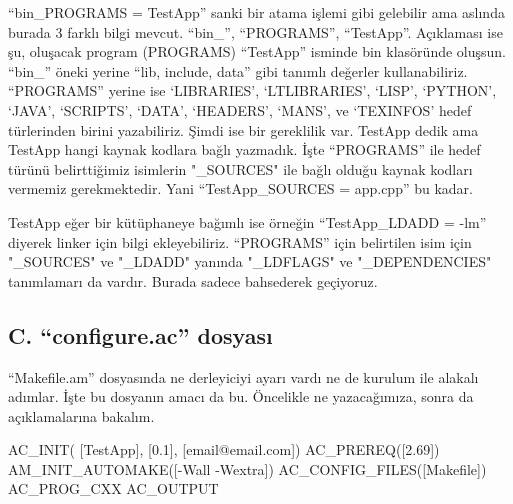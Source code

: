 \documentclass[
]{book}
\newenvironment{Shaded}{\begin{snugshade}}{\end{snugshade}}
\newcommand{\ExtensionTok}[1]{#1}
\newcommand{\NormalTok}[1]{#1}
\begin{document}
``bin\_PROGRAMS = TestApp'' sanki bir atama işlemi gibi gelebilir ama aslında burada 3 farklı bilgi mevcut. ``bin\_'', ``PROGRAMS'', ``TestApp''. Açıklaması ise şu, oluşacak program (PROGRAMS) ``TestApp'' isminde bin klasöründe oluşsun. ``bin\_'' öneki yerine ``lib, include, data'' gibi tanımlı değerler kullanabiliriz. ``PROGRAMS'' yerine ise `LIBRARIES', `LTLIBRARIES', `LISP', `PYTHON', `JAVA', `SCRIPTS', `DATA', `HEADERS', `MANS', ve `TEXINFOS' hedef türlerinden birini yazabiliriz. Şimdi ise bir gereklilik var. TestApp dedik ama TestApp hangi kaynak kodlara bağlı yazmadık. İşte ``PROGRAMS'' ile hedef türünü belirttiğimiz isimlerin "\_SOURCES" ile bağlı olduğu kaynak kodları vermemiz gerekmektedir. Yani ``TestApp\_SOURCES = app.cpp'' bu kadar.

TestApp eğer bir kütüphaneye bağımlı ise örneğin ``TestApp\_LDADD = -lm'' diyerek linker için bilgi ekleyebiliriz. ``PROGRAMS'' için belirtilen isim için "\_SOURCES" ve "\_LDADD" yanında "\_LDFLAGS" ve "\_DEPENDENCIES" tanımlamarı da vardır. Burada sadece bahsederek geçiyoruz.

\hypertarget{c.-configure.ac-dosyasux131}{%
\subsection*{C. ``configure.ac'' dosyası}\label{c.-configure.ac-dosyasux131}}

``Makefile.am'' dosyasında ne derleyiciyi ayarı vardı ne de kurulum ile alakalı adımlar. İşte bu dosyanın amacı da bu. Öncelikle ne yazacağımıza, sonra da açıklamalarına bakalım.

\begin{Shaded}
\begin{Highlighting}[]
\ExtensionTok{AC\_INIT}\NormalTok{( [TestApp], [0.1], [email@email.com])}
\ExtensionTok{AC\_PREREQ}\NormalTok{([2.69])  }
\ExtensionTok{AM\_INIT\_AUTOMAKE}\NormalTok{([{-}Wall {-}Wextra])}
\ExtensionTok{AC\_CONFIG\_FILES}\NormalTok{([Makefile])}
\ExtensionTok{AC\_PROG\_CXX} 
\ExtensionTok{AC\_OUTPUT} 
\end{Highlighting}
\end{Shaded}
\end{document}
